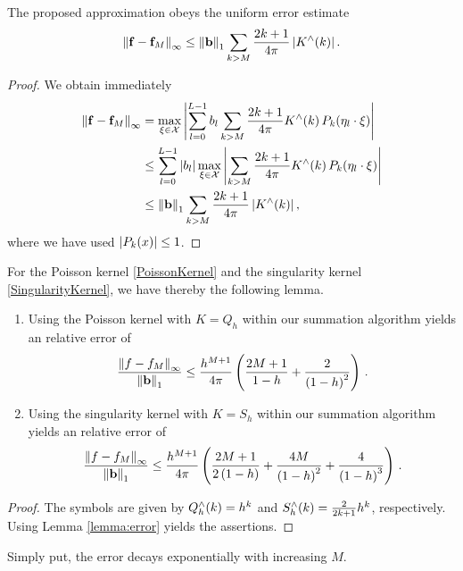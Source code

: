\begin{lemma}\label{lemma:error}
  The proposed approximation obeys the uniform error estimate
  \begin{equation}
    \label{Applications:UniformErrorBound}
    \left\|\mathbf{f} - \mathbf{f}_{M}\right\|_{\infty} \le \left\|\mathbf{b}\right\|_1 \sum_{k>M}
    \frac{2k+1}{4\pi} \left\vert K^{\wedge}{\hspace{-0.4ex}}\left(k\right)\right\vert.
  \end{equation}
\end{lemma}
\begin{proof}
  We obtain immediately
  \begin{align*}
    \left\|\mathbf{f} - \mathbf{f}_{M}\right\|_{\infty} 
    & = \max_{\mathbf{\xi} \in \mathcal{X}} 
        \left|\sum_{l=0}^{L-1} b_{l} \sum_{k>M} \frac{2k+1}{4\pi} K^{\wedge}{\hspace{-0.4ex}}\left(k\right) 
        P_{k}{\hspace{-0.4ex}}\left(\mathbf{\eta}_{l} \cdot \mathbf{\xi}\right)\right| \\
    & \le \sum_{l=0}^{L-1} \left| b_{l} \right| \max_{\mathbf{\xi} \in \mathcal{X}} 
      \left| \sum_{k>M} \frac{2k+1}{4\pi} K^{\wedge}{\hspace{-0.4ex}}\left(k\right) 
      P_{k}{\hspace{-0.4ex}}\left(\mathbf{\eta}_{l} \cdot \mathbf{\xi}\right) \right| \\
    & \le \left\|\mathbf{b}\right\|_1 \sum_{k>M} \frac{2k+1}{4\pi} \left\vert K^{\wedge}{\hspace{-0.4ex}}\left(k\right)\right\vert,
  \end{align*}
  where we have used $\left|P_{k}{\hspace{-0.4ex}}\left(x\right)\right| \le 1$. 
\end{proof}

For the Poisson kernel \eqref{PoissonKernel} and the singularity kernel
\eqref{SingularityKernel}, we have thereby the following lemma.

\begin{lemma}
 \begin{enumerate}
   \item 
Using the Poisson kernel with $K=Q_h$ within our summation algorithm yields an relative 
error of
     \begin{equation}
       \label{error:poisson}
       \frac{\left\|f - f_{M}\right\|_{\infty}}{\left\|\mathbf{b}\right\|_1} \le
       \frac{h^{M+1}}{4\pi}
       \left(\frac{2M+1}{1-h}+\frac{2}{\left(1-h\right)^2}\right)\, .
     \end{equation}
     \item 
Using the singularity kernel with $K=S_h$ within our summation algorithm yields 
an relative error of
       \begin{equation}
         \label{error:singular}
         \frac{\left\|f - f_{M}\right\|_{\infty}}{\left\|\mathbf{b}\right\|_1} \le
         \frac{h^{M+1}}{4\pi} \left(\frac{2M+1}{2\left(1-h\right)}+
           \frac{4M}{\left(1-h\right)^2}+
         \frac{4}{\left(1-h\right)^3}\right)\, .
       \end{equation}
 \end{enumerate}
\end{lemma}
\begin{proof}
The symbols are given by $Q_{h}^{\wedge}{\hspace{-0.4ex}}\left(k\right)=h^k$ and
$S_{h}^{\wedge}{\hspace{-0.4ex}}\left(k\right)=\frac{2}{2k+1}h^k$, respectively.
Using Lemma \ref{lemma:error} yields the assertions.
\end{proof}
Simply put, the error decays exponentially with increasing $M$.


